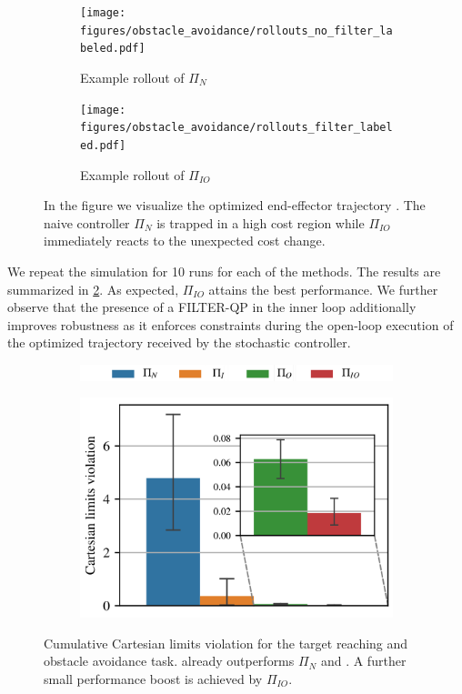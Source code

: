 \begin{figure}[t]
\centering
\begin{subfigure}{0.48\columnwidth}
    \texttt{[image: figures/obstacle\_avoidance/rollouts\_no\_filter\_labeled.pdf]}
    \caption{Example rollout of $\Pi_{N}$}
\end{subfigure}%
\hfill
\begin{subfigure}{0.48\columnwidth}
    \texttt{[image: figures/obstacle\_avoidance/rollouts\_filter\_labeled.pdf]}
    \caption{Example rollout of $\Pi_{IO}$}
\end{subfigure}%
\hfill
\caption{In the figure we visualize the optimized end-effector trajectory  .  The naive controller $\Pi_{N}$ is trapped in a high cost region while $\Pi_{IO}$ immediately reacts to the unexpected cost change.}\label{fig:rollouts_comparison}
\end{figure}

We repeat the simulation for 10 runs for each of the methods. The results are summarized in \fig \ref{fig:obstacle_avoidance}. As expected, $\Pi_{IO}$ attains the best performance. We further observe that the presence of a FILTER-QP in the inner loop additionally improves robustness as it enforces constraints during the open-loop execution of the optimized trajectory received by the stochastic controller. 
\begin{figure}[t]
\begin{subfigure}{1\columnwidth}
    \includegraphics[width=\linewidth]{figures/methods_comparison/legend.pdf}
\end{subfigure}%
\hfill

\begin{subfigure}{1\columnwidth}
    \centering
    \hspace*{-0.2cm} 
    \includegraphics[width=0.6\columnwidth]{figures/obstacle_avoidance/obstacle_avoidance_test_no_legend.pdf}
\end{subfigure}
\caption{Cumulative Cartesian limits violation for the target reaching and obstacle avoidance task. \ctrlOuter already outperforms $\Pi_{N}$ and \ctrlInner. A further small performance boost is achieved by $\Pi_{IO}$.}
 \label{fig:obstacle_avoidance}
\end{figure}


